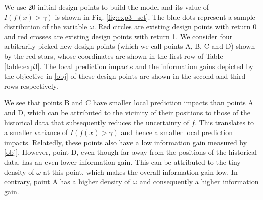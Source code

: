 \documentclass{wscpaperproc}
\theoremstyle{wsc}
\begin{document}
We use 20 initial design points to build the model and its value of $I(f(x)>\gamma)$ is shown in Fig. \ref{fig:exp3_set}. The blue dots represent a sample distribution of the variable $\omega$. Red circles are existing design points with return 0 and red crosses are existing design points with return 1. We consider four arbitrarily picked new design points (which we call points A, B, C and D) shown by the red stars, whose coordinates are shown in the first row of Table \ref{table:exp3}. The local prediction impacts and the information gains depicted by the objective in \eqref{obj} of these design points are shown in the second and third rows respectively.

We see that points B and C have smaller local prediction impacts than points A and D, which can be attributed to the vicinity of their positions to those of the historical data that subsequently reduces the uncertainty of $f$. This translates to a smaller variance of $I(f(x)>\gamma)$ and hence a smaller local prediction impacts. Relatedly, these points also have a low information gain measured by \eqref{obj}. However, point D, even though far away from the positions of the historical data, has an even lower information gain. This can be attributed to the tiny density of $\omega$ at this point, which makes the overall information gain low. In contrary, point A has a higher density of $\omega$ and consequently a higher information gain.


\end{document}
